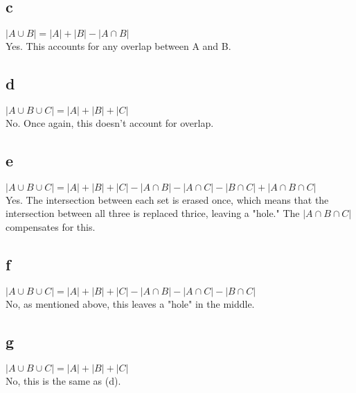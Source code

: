 \documentclass[12pt]{article}
\begin{document}
\subsection*{c}
\(|A \cup B| = |A| + |B| - |A \cap B|\)\\
Yes. This accounts for any overlap between A and B.\\
\subsection*{d}
\(|A \cup B \cup C| = |A| + |B| + |C|\)\\
No. Once again, this doesn't account for overlap.\\
\subsection*{e}
\(|A \cup B \cup C| = |A| + |B| + |C| - |A \cap B| - |A \cap C| - |B \cap C| + |A \cap B \cap C|\)\\
Yes. The intersection between each set is erased once, which means that the intersection between all three is replaced thrice, leaving a "hole." The \(|A \cap B \cap C|\) compensates for this.\\
\subsection*{f}
\(|A \cup B \cup C| = |A| + |B| + |C| - |A \cap B| - |A \cap C| - |B \cap C|\)\\
No, as mentioned above, this leaves a "hole" in the middle.\\
\subsection*{g}
\(|A \cup B \cup C| = |A| + |B| + |C|\)\\
No, this is the same as (d).
\end{document}
